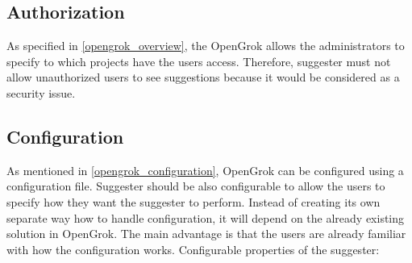 \subsection{Authorization}
As specified in \ref{opengrok_overview}, the OpenGrok allows the administrators to specify to which projects have the users
access. Therefore, suggester must not allow unauthorized users to see suggestions because it would be considered as a security issue.

\subsection{Configuration}
\label{suggester_config}
As mentioned in \ref{opengrok_configuration}, OpenGrok can be configured using a configuration file.
Suggester should be also configurable to allow the users to specify how they want the suggester to perform.
Instead of creating its own separate way how to handle configuration, it will depend on the already existing solution in
OpenGrok. The main advantage is that the users are already familiar with how the configuration works. Configurable
properties of the suggester:
